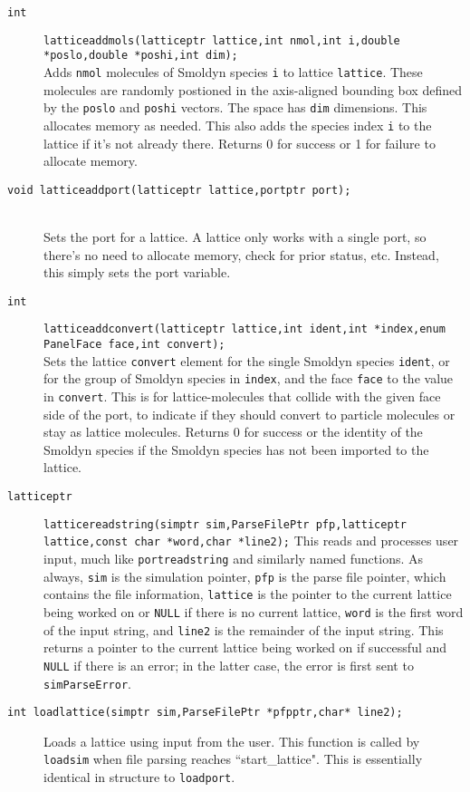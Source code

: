 \documentclass {book}
\newcommand {\ttt} {\texttt}
\begin{document}
\begin{description}
\item[\ttt{int}]
\ttt{latticeaddmols(latticeptr lattice,int nmol,int i,double *poslo,double *poshi,int dim);}
\hfill \\
Adds \ttt{nmol} molecules of Smoldyn species \ttt{i} to lattice \ttt{lattice}. These molecules are randomly postioned in the axis-aligned bounding box defined by the \ttt{poslo} and \ttt{poshi} vectors. The space has \ttt{dim} dimensions. This allocates memory as needed. This also adds the species index \ttt{i} to the lattice if it's not already there. Returns 0 for success or 1 for failure to allocate memory.

\item[\ttt{void latticeaddport(latticeptr lattice,portptr port);}]
\hfill \\
Sets the port for a lattice. A lattice only works with a single port, so there's no need to allocate memory, check for prior status, etc. Instead, this simply sets the port variable.

\item[\ttt{int}]
\ttt{latticeaddconvert(latticeptr lattice,int ident,int *index,enum PanelFace face,int convert);}
\hfill \\
Sets the lattice \ttt{convert} element for the single Smoldyn species \ttt{ident}, or for the group of Smoldyn species in \ttt{index}, and the face \ttt{face} to the value in \ttt{convert}. This is for lattice-molecules that collide with the given face side of the port, to indicate if they should convert to particle molecules or stay as lattice molecules. Returns 0 for success or the identity of the Smoldyn species if the Smoldyn species has not been imported to the lattice.

\item[\ttt{latticeptr}]
\ttt{latticereadstring(simptr sim,ParseFilePtr pfp,latticeptr lattice,const char *word,char *line2);}
This reads and processes user input, much like \ttt{portreadstring} and similarly named functions. As always, \ttt{sim} is the simulation pointer, \ttt{pfp} is the parse file pointer, which contains the file information, \ttt{lattice} is the pointer to the current lattice being worked on or \ttt{NULL} if there is no current lattice, \ttt{word} is the first word of the input string, and \ttt{line2} is the remainder of the input string. This returns a pointer to the current lattice being worked on if successful and \ttt{NULL} if there is an error; in the latter case, the error is first sent to \ttt{simParseError}. 

\item[\ttt{int loadlattice(simptr sim,ParseFilePtr *pfpptr,char* line2);}]
Loads a lattice using input from the user. This function is called by \ttt{loadsim} when file parsing reaches ``start\_lattice". This is essentially identical in structure to \ttt{loadport}.


\end{description}
\end{document}
